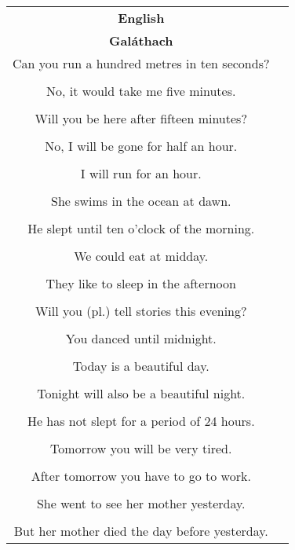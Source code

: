 \begin{table}[H]
\centering
\begin{tabular}{|c|M{5.0cm}|}
  \toprule
  \textbf{English}\\
  \textbf{Gal\'{a}thach}\\
  \toprule
  Can you run a hundred metres in ten seconds?\\
  \\
  \midrule
  No, it would take me five minutes.\\
  \\
  \midrule
  Will you be here after fifteen minutes?\\
  \\
  \midrule
  No, I will be gone for half an hour.\\
  \\
  \midrule
  I will run for an hour.\\
  \\
  \midrule
  She swims in the ocean at dawn.\\
  \\
  \midrule
  He slept until ten o’clock of the morning.\\
  \\
  \midrule
  We could eat at midday.\\
  \\
  \midrule
  They like to sleep in the afternoon\\
  \\
  \midrule
  Will you (pl.) tell stories this evening?\\
  \\
  \midrule
  You danced until midnight.\\
  \\
  \midrule
  Today is a beautiful day.\\
  \\
  \midrule
  Tonight will also be a beautiful night.\\
  \\
  \midrule
  He has not slept for a period of 24 hours.\\
  \\
  \midrule
  Tomorrow you will be very tired.\\
  \\
  \midrule
  After tomorrow you have to go to work.\\
  \\
  \midrule
  She went to see her mother yesterday.\\
  \\
  \midrule
  But her mother died the day before yesterday.\\

\end{tabular}
\end{table}
